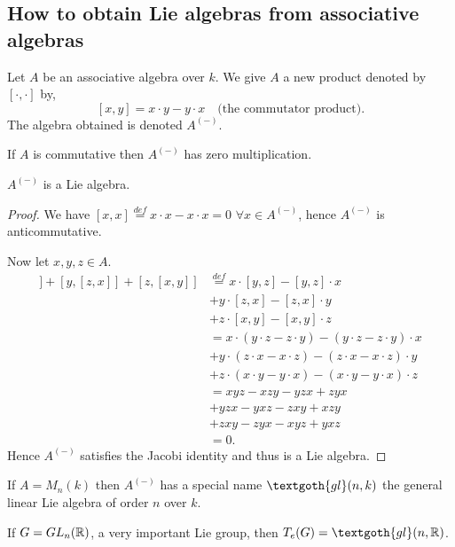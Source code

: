\subsection{How to obtain Lie algebras from associative algebras}

Let $A$ be an associative algebra over $k$. We give $A$ a new product denoted by $[\cdot,\cdot]$ by,
\[
  [x,y] = x \cdot y - y \cdot x \quad \text{(the commutator product)}.
\]
The algebra obtained is denoted $A^{(-)}$.

\begin{remark}
  If $A$ is commutative then $A^{(-)}$ has zero multiplication.
\end{remark}

\begin{proposition}
  $A^{(-)}$ is a Lie algebra.
\end{proposition}

\begin{proof}
  We have $[x,x] \overset{def}{=} x \cdot x - x \cdot x = 0$ $\forall x \in A^{(-)}$, hence $A^{(-)}$ is anticommutative.

  Now let $x,y,z \in A$.
  \begin{align*}
    [x,[y,z]] + [y,[z,x]] + [z,[x,y]] &\overset{def}{=} x \cdot [y,z] - [y,z] \cdot x\\
    &+ y \cdot [z,x] - [z,x] \cdot y\\
    &+ z \cdot [x,y] - [x,y] \cdot z\\
    &= x \cdot (y \cdot z - z \cdot y) - (y \cdot z - z \cdot y) \cdot x\\
    &+ y \cdot (z \cdot x - x \cdot z) - (z \cdot x - x \cdot z) \cdot y\\
    &+ z \cdot (x \cdot y - y \cdot x) - (x \cdot y - y \cdot x) \cdot z\\
    &= xyz - xzy - yzx + zyx\\
    &+ yzx - yxz - zxy + xzy\\
    &+ zxy - zyx - xyz + yxz\\
    &= 0.
  \end{align*}
  Hence $A^{(-)}$ satisfies the Jacobi identity and thus is a Lie algebra.
\end{proof}

If $A = M_n(k)$ then $A^{(-)}$ has a special name $\textgoth{gl}(n, k)$ the general linear Lie algebra of order $n$ over $k$.

\begin{remark}
  If $G=GL_n(\mathbb{R})$, a very important Lie group, then $T_e(G) = \textgoth{gl}(n, \R)$.
\end{remark}
